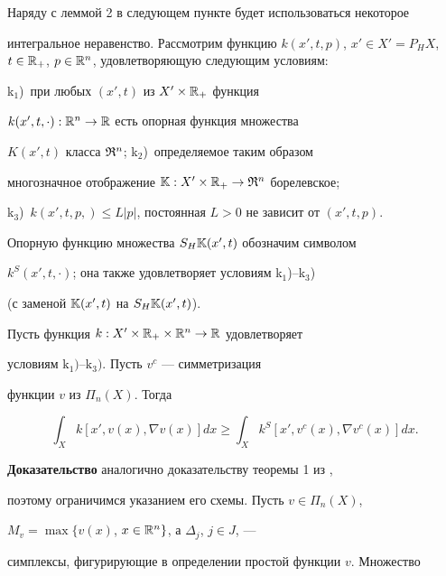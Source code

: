  


Наряду с леммой 2 в следующем пункте будет использоваться некоторое 


интегральное неравенство. Рассмотрим функцию $k(x',t,p)$, $x'\in X'=P_H 


X$, $t\in\Bbb R_+$, $p\in\Bbb R^n$, удовлетворяющую следующим условиям: 


k$_1$)~при любых $(x',t)$ из $X'\times\Bbb R_+$ функция 


$k(x',t,\cdot):\Bbb R^n\to\Bbb R$ есть опорная функция множества 


$K(x',t)$ класса $\frak R^n$; k$_2$)~определяемое таким образом 


многозначное отображение $\Bbb K:X'\times\Bbb R_+\to\frak R^n$ борелевское; 


k$_3$)~$k(x',t,p,)\le L|p|$, постоянная $L>0$ не зависит от $(x',t,p)$. 


Опорную функцию множества $S_H\Bbb K(x',t)$ обозначим символом 


$k^S(x',t,\cdot)$; она также удовлетворяет условиям k$_1$)--k$_3$)


(с заменой $\Bbb K(x',t)$ на $S_H\Bbb K(x',t)$). 


 


\begin{lem} 


Пусть функция $k:X'\times\Bbb R_+\times\Bbb R^n\to\Bbb R$ удовлетворяет 


условиям $\mathrm k_1)$--$\mathrm k_3)$. Пусть $v^c$ --- симметризация 


функции $v$ из $\Pi_n(X)$. Тогда 


\begin{equation} 


\int_X k[x',v(x),\nabla v(x)]d x\ge\int_X 


k^S[x',v^c(x),\nabla v^c(x)]d x. 


\end{equation} 


\end{lem} 


 


{\bf Доказательство} аналогично доказательству теоремы 1 из \cite{8}, 


поэтому ограничимся указанием его схемы. Пусть $v\in\Pi_n(X)$, 


$M_v=\max\{v(x)$, $x\in\Bbb R^n\}$, а $\Delta_j$, $j\in J$, --- 


симплексы, фигурирующие в определении простой функции $v$. Множество 


